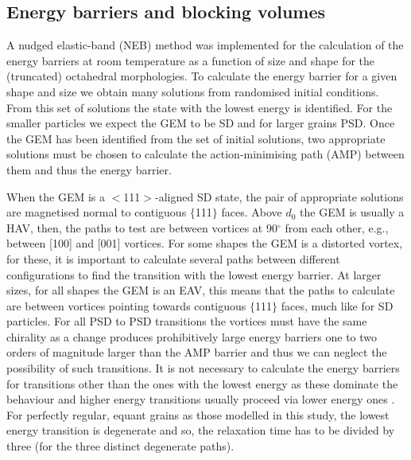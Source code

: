 \documentclass[review,authoryear]{elsarticle}
\begin{document}
\subsection{Energy barriers and blocking volumes}
A nudged elastic-band (NEB) method \citep{Fabian2017} was implemented for the calculation of the energy barriers at room temperature as a function of size and shape for the (truncated) octahedral morphologies. To calculate the energy barrier for a given shape and size we obtain many solutions from randomised initial conditions. From this set of solutions the state with the lowest energy is identified. For the smaller particles we expect the GEM to be SD and for larger grains PSD. Once the GEM has been identified from the set of initial solutions, two appropriate solutions must be chosen to calculate the action-minimising path (AMP) between them and thus the energy barrier.\par

When the GEM is a $<$111$>$-aligned SD state, the pair of appropriate solutions are magnetised normal to contiguous $\{$111$\}$ faces. Above $d_0$ the GEM is usually a HAV, then, the paths to test are between vortices at 90$^{\circ}$ from each other, e.g., between [100] and [001] vortices. For some shapes the GEM is a distorted vortex, for these, it is important to calculate several paths between different configurations to find the transition with the lowest energy barrier. At larger sizes, for all shapes the GEM is an EAV, this means that the paths to calculate are between vortices pointing towards contiguous $\{$111$\}$ faces, much like for SD particles. For all PSD to PSD transitions the vortices must have the same chirality as a change produces prohibitively large energy barriers one to two orders of magnitude larger than the AMP barrier and thus we can neglect the possibility of such transitions. It is not necessary to calculate the energy barriers for transitions other than the ones with the lowest energy as these dominate the behaviour and higher energy transitions usually proceed via lower energy ones \citep{Nagy2017}. For perfectly regular, equant grains as those modelled in this study, the lowest energy transition is degenerate and so, the relaxation time has to be divided by three (for the three distinct degenerate paths).\par
\end{document}
